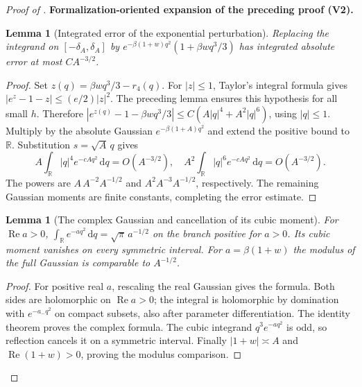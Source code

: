\documentclass[11pt]{article}
\newtheorem{lemma}[theorem]{Lemma}
\newcommand{\formalisationparentid}{X}
\newenvironment{formalisationaddition}[1]{\par\medskip\begingroup\color{blue}\def\formalisationparentid{#1}\setcounter{formalizationsublemma}{0}\let\lemma\formalizationsublemma\let\endlemma\endformalizationsublemma
  \def\Eo{\mathcal E_h^\circ}\def\EE{\mathcal E_h}\def\phio{\phi_h^\circ}\def\phih{\phi_h}\def\Ho{H_h^{\rm atom}(v^\circ)}\def\Ha{H_h^{\rm atom}}\def\HL{H_h^{L}}\def\Dh{D_h}\def\Log{\operatorname{Log}}\def\ellh{\ell_h}\def\Gp{G_{p,h}}\def\Ast{A_{*,h}}\def\ahat{\widehat{\mathfrak a}_h}\def\ah{\mathfrak a_h}\def\rh{\widehat\rho_h}\def\deltah{\widehat\delta_h}\def\oldref##1{\textup{(##1)}}\def\interface##1{\par\noindent\textit{Analytical interface used here.} ##1\par}\def\finish{\par\noindent\textit{Conclusion of the formalization-oriented expansion.} }\par\noindent\textbf{Formalization-oriented expansion of the preceding proof (V2).}\par\smallskip
}{\par\endgroup\medskip
}
\newcommand{\R}{\mathbb R}
\newcommand{\Rea}{\operatorname{Re}}
\begin{document}
\begin{proof}[Proof of ]
\begin{formalisationaddition}{D-T6.4}
\begin{lemma}[Integrated error of the exponential perturbation]\label{sublemma:D6-4-perturbation-error}
Replacing the integrand on $[-\delta_A,\delta_A]$ by
$e^{-\beta(1+w)q^2}(1+\beta wq^3/3)$ has integrated absolute error
at most $CA^{-3/2}$.
\end{lemma}
\begin{proof}
Set $z(q)=\beta wq^3/3-r_4(q)$.
For $|z|\le1$, Taylor's integral formula gives
$|e^z-1-z|\le(e/2)|z|^2$.
The preceding lemma ensures this hypothesis for all small $h$.
Therefore
$|e^{z(q)}-1-\beta wq^3/3|
 \le C(A|q|^4+A^2|q|^6)$, using $|q|\le1$.
Multiply by the absolute Gaussian
$e^{-\beta(1+A)q^2}$ and extend the positive bound to $\R$.
Substitution $s=\sqrt A\,q$ gives
\[
 A\int_\R |q|^4e^{-cAq^2}\,\mathrm dq=O(A^{-3/2}),\quad
 A^2\int_\R |q|^6e^{-cAq^2}\,\mathrm dq=O(A^{-3/2}).
\]
The powers are $A\,A^{-2}A^{-1/2}$ and
$A^2A^{-3}A^{-1/2}$, respectively. The remaining Gaussian moments
are finite constants, completing the error estimate.
\end{proof}

\begin{lemma}[The complex Gaussian and cancellation of its cubic moment]\label{sublemma:D6-4-complex-gaussian}
For $\Rea a>0$,
$\int_\R e^{-aq^2}\,\mathrm dq=\sqrt\pi\,a^{-1/2}$ on the branch
positive for $a>0$. Its cubic moment vanishes on every symmetric interval.
For $a=\beta(1+w)$ the modulus of the full Gaussian is comparable to
$A^{-1/2}$.
\end{lemma}
\begin{proof}
For positive real $a$, rescaling the real Gaussian gives the formula.
Both sides are holomorphic on $\Rea a>0$; the integral is holomorphic
by domination with $e^{-a_-q^2}$ on compact subsets, also after
parameter differentiation. The identity theorem proves the complex
formula. The cubic integrand $q^3e^{-aq^2}$ is odd, so reflection
cancels it on a symmetric interval. Finally
$|1+w|\asymp A$ and $\Rea(1+w)>0$, proving the modulus comparison.
\end{proof}


\end{formalisationaddition}
\end{proof}
\end{document}
